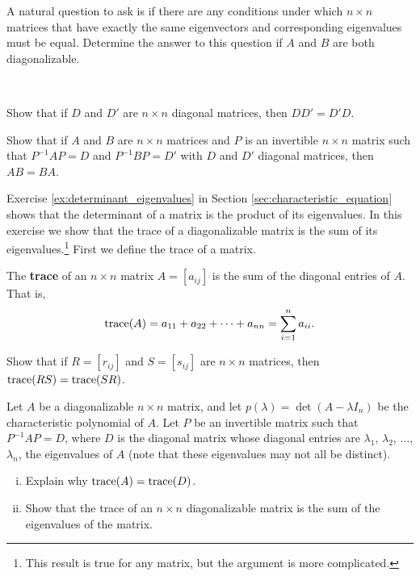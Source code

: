 	\item A natural question to ask is if there are any conditions under which $n \times n$ matrices that have exactly the same eigenvectors and corresponding eigenvalues must be equal. Determine the answer to this question if $A$ and $B$ are both diagonalizable. 

	\ea

\item ~
	\ba
	\item Show that if $D$ and $D'$ are $n \times n$ diagonal matrices, then $DD' = D'D$. 

	\item Show that if $A$ and $B$ are $n \times n$ matrices and $P$ is an invertible $n \times n$ matrix such that $P^{-1}AP = D$ and $P^{-1}BP = D'$ with $D$ and $D'$ diagonal matrices, then $AB = BA$. 

	\ea


\item \label{ex:trace_eigenvalues} Exercise \ref{ex:determinant_eigenvalues} in Section \ref{sec:characteristic_equation} shows that the determinant of a matrix is the product of its eigenvalues. In this exercise we show that the trace of a diagonalizable matrix is the sum of its eigenvalues.\footnote{This result is true for any matrix, but the argument is more complicated.} First we define the trace of a matrix. 

\begin{definition} \label{def:trace} The \textbf{trace} of an $n \times n$ matrix $A = [a_{ij}]$ is the sum of the diagonal entries of $A$. That is,
\[\text{trace}(A) = a_{11} + a_{22} + \cdots + a_{nn} = \sum_{i=1}^n a_{ii}.\]
\end{definition}

\ba
\item Show that if $R = [r_{ij}]$ and $S = [s_{ij}]$ are $n \times n$ matrices, then $\text{trace}(RS) = \text{trace}(SR)$. 

\item Let $A$ be a diagonalizable $n \times n$ matrix, and let $p(\lambda) = \det(A - \lambda I_n)$ be the characteristic polynomial of $A$. Let $P$ be an invertible matrix such that $P^{-1}AP = D$, where $D$ is the diagonal matrix whose diagonal entries are $\lambda_1$, $\lambda_2$, $\ldots$, $\lambda_n$,  the eigenvalues of $A$ (note that these eigenvalues may not all be distinct). 
	\begin{enumerate}[i.]
	\item Explain why $\text{trace}(A) = \text{trace}(D)$. 
	
	\item Show that the trace of an $n \times n$ diagonalizable matrix is the sum of the eigenvalues of the matrix. 
	\end{enumerate}
	
